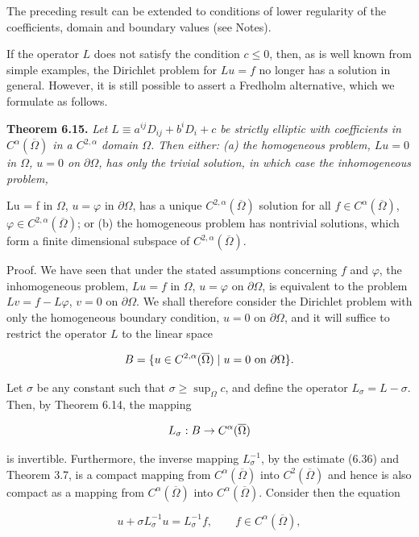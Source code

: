 The preceding result can be extended to conditions of lower regularity of the
coefficients, domain and boundary values (see Notes).

If the operator $L$ does not satisfy the condition $c\leq 0$, then, as is well known
from simple examples, the Dirichlet problem for $Lu=f$ no longer has a solution
in general. However, it is still possible to assert a Fredholm alternative, which we
formulate as follows.

\textbf{Theorem 6.15.} \textit{Let $L\equiv a^{ij}D_{ij}+b^iD_i+c$ be strictly elliptic with coefficients in
$C^\alpha(\overline{\Omega})$ in a $C^{2,\alpha}$ domain $\Omega$. Then either: (a) the homogeneous problem, $Lu=0$ in
$\Omega$, $u=0$ on $\partial\Omega$, has only the trivial solution, in which case the inhomogeneous problem,
}


Lu = f in $\Omega$, $u = \varphi$ in $\partial\Omega$, has a unique $C^{2,\alpha}(\overline{\Omega})$ solution for all $f \in C^\alpha(\overline{\Omega})$, $\varphi \in C^{2,\alpha}(\overline{\Omega})$;
or (b) the homogeneous problem has nontrivial solutions, which form a finite dimensional subspace of $C^{2,\alpha}(\overline{\Omega})$.

Proof. We have seen that under the stated assumptions concerning $f$ and $\varphi$, the inhomogeneous problem, $Lu = f$ in $\Omega$, $u = \varphi$ on $\partial\Omega$, is equivalent to the problem $Lv = f - L\varphi$, $v = 0$ on $\partial\Omega$. We shall therefore consider the Dirichlet problem with only the homogeneous boundary condition, $u = 0$ on $\partial\Omega$, and it will suffice to restrict the operator $L$ to the linear space

\[
B = \{u \in C^{2,\alpha}(\overline{\Omega}) \mid u = 0 \text{ on } \partial\Omega\}.
\]

Let $\sigma$ be any constant such that $\sigma \ge \sup_\Omega c$, and define the operator $L_\sigma = L - \sigma$.
Then, by Theorem 6.14, the mapping

\[
L_\sigma : B \to C^\alpha(\overline{\Omega})
\]

is invertible. Furthermore, the inverse mapping $L_\sigma^{-1}$, by the estimate (6.36) and Theorem 3.7, is a compact mapping from $C^\alpha(\overline{\Omega})$ into $C^{2}(\overline{\Omega})$ and hence is also compact as a mapping from $C^\alpha(\overline{\Omega})$ into $C^\alpha(\overline{\Omega})$. Consider then the equation

\begin{equation}
u + \sigma L_\sigma^{-1}u = L_\sigma^{-1}f, \qquad f \in C^\alpha(\overline{\Omega}),
\tag{6.46}
\end{equation}

